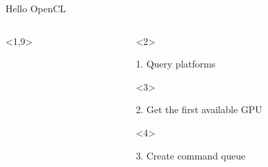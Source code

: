 \documentclass[@BEAMER_OPTIONS@]{beamer}
\begin{document}
\begin{frame}[fragile]{Hello OpenCL}
\begin{columns}
\begin{column}[c]{0.25\textwidth}
\begin{exampleblock}{}
\begin{adjustbox}{width=0.25\textwidth, height=\textheight, keepaspectratio}
\begin{minipage}{\textwidth}
\begin{uncoverenv}
                            
                        \end{uncoverenv}
                        \begin{uncoverenv}<1,9>
                            
                        \end{uncoverenv}
                    \end{minipage}
                \end{adjustbox}
            \end{exampleblock}
        \end{column}
        \begin{column}[c]{0.7\textwidth}
            \begin{onlyenv}<2>
                \begin{exampleblock}{1. Query platforms}
                    \begin{adjustbox}{width=0.75\textwidth, height=\textheight, keepaspectratio}
                        \begin{minipage}{\textwidth}
                            
                        \end{minipage}
                    \end{adjustbox}
                \end{exampleblock}
            \end{onlyenv}
            \begin{onlyenv}<3>
                \begin{exampleblock}{2. Get the first available GPU}
                    \begin{adjustbox}{width=0.75\textwidth, height=\textheight, keepaspectratio}
                        \begin{minipage}{\textwidth}
                            
                        \end{minipage}
                    \end{adjustbox}
                \end{exampleblock}
            \end{onlyenv}
            \begin{onlyenv}<4>
                \begin{exampleblock}{3. Create command queue}
                    \begin{adjustbox}{width=0.75\textwidth, height=\textheight, keepaspectratio}

\end{adjustbox}
\end{exampleblock}
\end{onlyenv}
\end{column}
\end{columns}
\end{frame}
\end{document}
